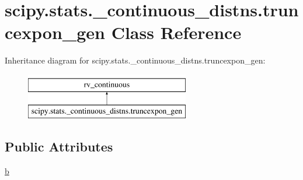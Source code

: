 \hypertarget{classscipy_1_1stats_1_1__continuous__distns_1_1truncexpon__gen}{}\section{scipy.\+stats.\+\_\+continuous\+\_\+distns.\+truncexpon\+\_\+gen Class Reference}
\label{classscipy_1_1stats_1_1__continuous__distns_1_1truncexpon__gen}
Inheritance diagram for scipy.\+stats.\+\_\+continuous\+\_\+distns.\+truncexpon\+\_\+gen\+:\begin{figure}[H]
\begin{center}
\leavevmode
\includegraphics[height=2.000000cm]{classscipy_1_1stats_1_1__continuous__distns_1_1truncexpon__gen}
\end{center}
\end{figure}
\subsection*{Public Attributes}
\begin{DoxyCompactItemize}
\item 
\hyperlink{classscipy_1_1stats_1_1__continuous__distns_1_1truncexpon__gen_a5d7cdf9a076282370dde8058e47c271e}{b}
\end{DoxyCompactItemize}


